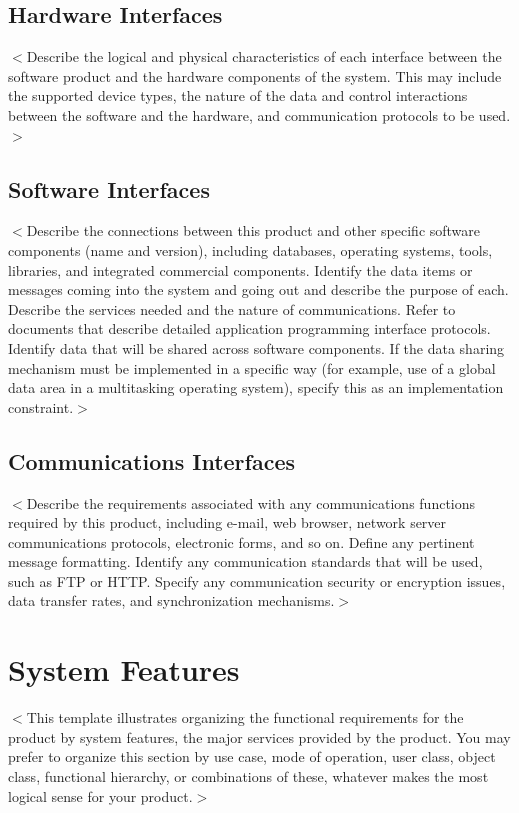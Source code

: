 \documentclass{scrreprt}
\begin{document}
\begin{CJK}{UTF8}{bkai}
\section{Hardware Interfaces}
$<$Describe the logical and physical characteristics of each interface between 
the software product and the hardware components of the system. This may include 
the supported device types, the nature of the data and control interactions 
between the software and the hardware, and communication protocols to be 
used.$>$

\section{Software Interfaces}
$<$Describe the connections between this product and other specific software 
components (name and version), including databases, operating systems, tools, 
libraries, and integrated commercial components. Identify the data items or 
messages coming into the system and going out and describe the purpose of each.  
Describe the services needed and the nature of communications. Refer to 
documents that describe detailed application programming interface protocols.  
Identify data that will be shared across software components. If the data 
sharing mechanism must be implemented in a specific way (for example, use of a 
global data area in a multitasking operating system), specify this as an 
implementation constraint.$>$

\section{Communications Interfaces}
$<$Describe the requirements associated with any communications functions 
required by this product, including e-mail, web browser, network server 
communications protocols, electronic forms, and so on. Define any pertinent 
message formatting. Identify any communication standards that will be used, such 
as FTP or HTTP. Specify any communication security or encryption issues, data 
transfer rates, and synchronization mechanisms.$>$


\chapter{System Features}
$<$This template illustrates organizing the functional requirements for the 
product by system features, the major services provided by the product. You may 
prefer to organize this section by use case, mode of operation, user class, 
object class, functional hierarchy, or combinations of these, whatever makes the 
most logical sense for your product.$>$


\end{CJK}
\end{document}
